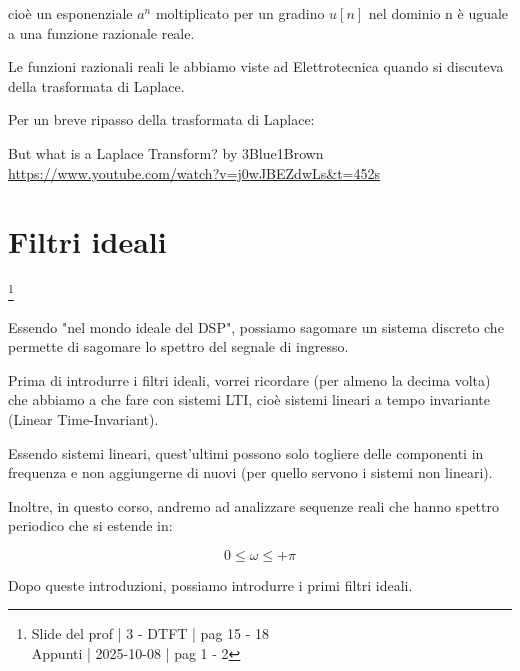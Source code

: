 cioè un esponenziale $a^n$ moltiplicato per un gradino $u \left[ n\right]$ nel dominio n 
è uguale a una funzione razionale reale. \newline 

\begin{tcolorbox}
    Le funzioni razionali reali le abbiamo viste ad Elettrotecnica quando si discuteva della trasformata di Laplace. \newline 

    Per un breve ripasso della trasformata di Laplace: \newline 

    But what is a Laplace Transform? by 3Blue1Brown \\
    \url{https://www.youtube.com/watch?v=j0wJBEZdwLs&t=452s}

\end{tcolorbox}

\newpage 

\section{Filtri ideali}

\footnote{ 
    Slide del prof | 3 - DTFT | pag 15 - 18\\
    Appunti | 2025-10-08 | pag 1 - 2
} 

Essendo "nel mondo ideale del DSP", 
possiamo sagomare un sistema discreto che permette di sagomare lo spettro del segnale di ingresso. \newline 

Prima di introdurre i filtri ideali, 
vorrei ricordare (per almeno la decima volta) che abbiamo a che fare con sistemi LTI, 
cioè sistemi lineari a tempo invariante (Linear Time-Invariant). \newline  

Essendo sistemi lineari, quest'ultimi possono solo togliere delle componenti in frequenza e non aggiungerne di nuovi (per quello servono i sistemi non lineari). \newline 

Inoltre, in questo corso, 
andremo ad analizzare sequenze reali che hanno spettro periodico che si estende in: 

{
    \Large 
    \begin{equation}
        0 \leq \omega \leq + \pi
    \end{equation}
}

Dopo queste introduzioni, possiamo introdurre i primi filtri ideali. \newline 

